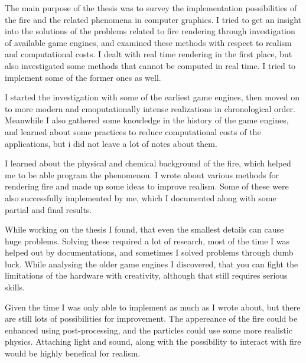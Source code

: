 

The main purpose of the thesis was to survey the implementation possibilities of the fire and the related phenomena in computer graphics. I tried to get an insight into the solutions of the problems related to fire rendering through investigation of available game engines, and examined these methods with respect to realism and computational costs. I dealt with real time rendering in the first place, but also investigated some methods that cannot be computed in real time. I tried to implement some of the former ones as well.

I started the investigation with some of the earliest game engines, then moved on to more modern and cmoputationally intense realizations in chronological order. Meanwhile I also gathered some knowledge in the history of the game engines, and learned about some practices to reduce computational costs of the applications, but i did not leave a lot of notes about them. 

I learned about the physical and chemical background of the fire, which helped me to be able program the phenomenon. I wrote about various methods for rendering fire and made up some ideas to improve realism. Some of these were also successfully implemented by me, which I documented along with some partial and final results.

While working on the thesis I found, that even the smallest details can cause huge problems. Solving these required a lot of research, most of the time I was helped out by documentations, and sometimes I solved problems through dumb luck. While analysing the older game engines I discovered, that you can fight the limitations of the hardware with creativity, although that still requires serious skills.

Given the time I was only able to implement as much as I wrote about, but there are still lots of possibilities for improvement. The appereance of the fire could be enhanced using post-processing, and the particles could use some more realistic physics. Attaching light and sound, along with the possibility to interact with fire would be highly benefical for realism.

